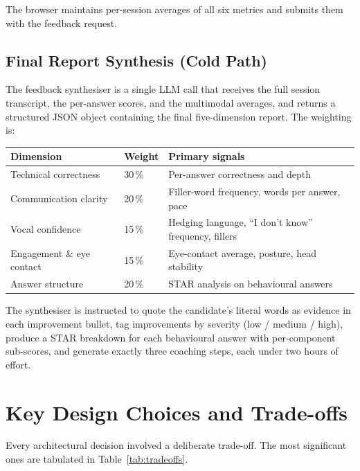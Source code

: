 \documentclass[11pt,a4paper]{article}
\begin{document}
The browser maintains per-session averages of all six metrics and submits
them with the feedback request.

\subsection{Final Report Synthesis (Cold Path)}

The feedback synthesiser is a single LLM call that receives the full
session transcript, the per-answer scores, and the multimodal averages,
and returns a structured JSON object containing the final five-dimension
report. The weighting is:

\vspace{4pt}
\begin{center}
\small
\begin{tabular}{lll}
\toprule
\textbf{Dimension} & \textbf{Weight} & \textbf{Primary signals} \\
\midrule
Technical correctness & 30\,\% & Per-answer correctness and depth \\
Communication clarity & 20\,\% & Filler-word frequency, words per answer, pace \\
Vocal confidence & 15\,\% & Hedging language, ``I don't know'' frequency, fillers \\
Engagement \& eye contact & 15\,\% & Eye-contact average, posture, head stability \\
Answer structure & 20\,\% & STAR analysis on behavioural answers \\
\bottomrule
\end{tabular}
\end{center}
\vspace{4pt}

The synthesiser is instructed to quote the candidate's literal words as
evidence in each improvement bullet, tag improvements by severity (low /
medium / high), produce a STAR breakdown for each behavioural answer with
per-component sub-scores, and generate exactly three coaching steps, each
under two hours of effort.

\section{Key Design Choices and Trade-offs}

Every architectural decision involved a deliberate trade-off. The most
significant ones are tabulated in Table~\ref{tab:tradeoffs}.
\end{document}
